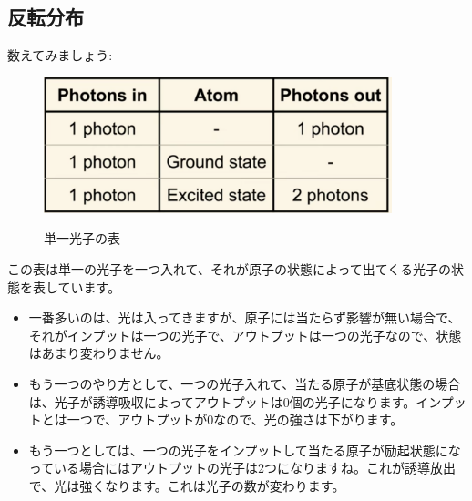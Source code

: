 \subsection{反転分布}
数えてみましょう:
\begin{figure}[H]
    \centering
    \includegraphics[width=0.9\textwidth]{lesson5/photon_table.pdf}
    \label{図: 1}
    \caption{単一光子の表}
\end{figure}
この表は単一の光子を一つ入れて、それが原子の状態によって出てくる光子の状態を表しています。
\begin{itemize}
    \item 一番多いのは、光は入ってきますが、原子には当たらず影響が無い場合で、それがインプットは一つの光子で、アウトプットは一つの光子なので、状態はあまり変わりません。
    \item もう一つのやり方として、一つの光子入れて、当たる原子が基底状態の場合は、光子が誘導吸収によってアウトプットは0個の光子になります。インプットとは一つで、アウトプットが0なので、光の強さは下がります。
    \item もう一つとしては、一つの光子をインプットして当たる原子が励起状態になっている場合にはアウトプットの光子は2つになりますね。これが誘導放出で、光は強くなります。これは光子の数が変わります。
\end{itemize}

